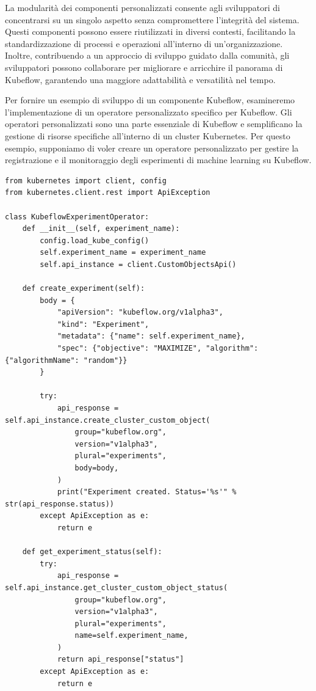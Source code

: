 La modularità dei componenti personalizzati consente agli sviluppatori di concentrarsi su un singolo aspetto senza compromettere l'integrità del sistema. Questi componenti possono essere riutilizzati in diversi contesti, facilitando la standardizzazione di processi e operazioni all'interno di un'organizzazione. Inoltre, contribuendo a un approccio di sviluppo guidato dalla comunità, gli sviluppatori possono collaborare per migliorare e arricchire il panorama di Kubeflow, garantendo una maggiore adattabilità e versatilità nel tempo.

Per fornire un esempio di sviluppo di un componente Kubeflow, esamineremo l'implementazione di un operatore personalizzato specifico per Kubeflow. Gli operatori personalizzati sono una parte essenziale di Kubeflow e semplificano la gestione di risorse specifiche all'interno di un cluster Kubernetes. Per questo esempio, supponiamo di voler creare un operatore personalizzato per gestire la registrazione e il monitoraggio degli esperimenti di machine learning su Kubeflow.

\begin{code}
\label{code:apx:a:python}
\begin{verbatim}
from kubernetes import client, config
from kubernetes.client.rest import ApiException

class KubeflowExperimentOperator:
    def __init__(self, experiment_name):
        config.load_kube_config()
        self.experiment_name = experiment_name
        self.api_instance = client.CustomObjectsApi()

    def create_experiment(self):
        body = {
            "apiVersion": "kubeflow.org/v1alpha3",
            "kind": "Experiment",
            "metadata": {"name": self.experiment_name},
            "spec": {"objective": "MAXIMIZE", "algorithm": {"algorithmName": "random"}}
        }

        try:
            api_response = self.api_instance.create_cluster_custom_object(
                group="kubeflow.org",
                version="v1alpha3",
                plural="experiments",
                body=body,
            )
            print("Experiment created. Status='%s'" % str(api_response.status))
        except ApiException as e:
            return e

    def get_experiment_status(self):
        try:
            api_response = self.api_instance.get_cluster_custom_object_status(
                group="kubeflow.org",
                version="v1alpha3",
                plural="experiments",
                name=self.experiment_name,
            )
            return api_response["status"]
        except ApiException as e:
            return e
\end{verbatim}
\end{code}

